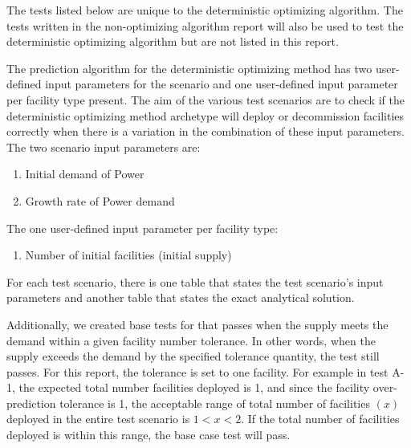 \documentclass[11pt,letterpaper]{article}
\begin{document}
The tests listed below are unique to the deterministic optimizing algorithm. The tests written in the non-optimizing algorithm report will also be used to test the deterministic optimizing algorithm but are not listed in this report. 

The prediction algorithm for the deterministic optimizing method has two user-defined input parameters for the scenario and one user-defined input parameter per facility type present. The aim of the various test scenarios are to check if the deterministic optimizing method archetype will deploy or decommission facilities correctly when there is a variation in the combination of these input parameters.  \\

The two scenario input parameters are: 
\begin{enumerate}
	\item Initial demand of Power
	\item Growth rate of Power demand
\end{enumerate}

The one user-defined input parameter per facility type:
\begin{enumerate}
	\item Number of initial facilities (initial supply)
\end{enumerate}

For each test scenario, there is one table that states the test scenario's input parameters and another table that states the exact analytical solution. 

Additionally, we created base tests for that passes when the supply meets the demand within a given facility number tolerance. In other words, when the supply exceeds the demand by the specified tolerance quantity, the test still passes. For this report, the tolerance is set to one facility. For example in test A-1, the expected total number facilities deployed is 1, and since the facility over-prediction tolerance is 1, the acceptable range of total number of facilities $(x)$ deployed in the entire test scenario is $1<x<2$. If the total number of facilities deployed is within this range, the base case test will pass.  
\end{document}

